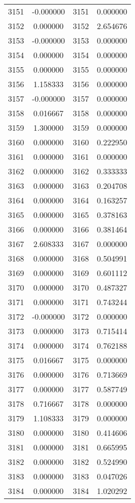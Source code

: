 \documentclass[12pt]{article}
\begin{document}
\begin{longtable}{@{}cccc@{}}
3151 & -0.000000 & 3151 & 0.000000 \\
3152 & 0.000000 & 3152 & 2.654676 \\
3153 & -0.000000 & 3153 & 0.000000 \\
3154 & 0.000000 & 3154 & 0.000000 \\
3155 & 0.000000 & 3155 & 0.000000 \\
3156 & 1.158333 & 3156 & 0.000000 \\
3157 & -0.000000 & 3157 & 0.000000 \\
3158 & 0.016667 & 3158 & 0.000000 \\
3159 & 1.300000 & 3159 & 0.000000 \\
3160 & 0.000000 & 3160 & 0.222950 \\
3161 & 0.000000 & 3161 & 0.000000 \\
3162 & 0.000000 & 3162 & 0.333333 \\
3163 & 0.000000 & 3163 & 0.204708 \\
3164 & 0.000000 & 3164 & 0.163257 \\
3165 & 0.000000 & 3165 & 0.378163 \\
3166 & 0.000000 & 3166 & 0.381464 \\
3167 & 2.608333 & 3167 & 0.000000 \\
3168 & 0.000000 & 3168 & 0.504991 \\
3169 & 0.000000 & 3169 & 0.601112 \\
3170 & 0.000000 & 3170 & 0.487327 \\
3171 & 0.000000 & 3171 & 0.743244 \\
3172 & -0.000000 & 3172 & 0.000000 \\
3173 & 0.000000 & 3173 & 0.715414 \\
3174 & 0.000000 & 3174 & 0.762188 \\
3175 & 0.016667 & 3175 & 0.000000 \\
3176 & 0.000000 & 3176 & 0.713669 \\
3177 & 0.000000 & 3177 & 0.587749 \\
3178 & 0.716667 & 3178 & 0.000000 \\
3179 & 1.108333 & 3179 & 0.000000 \\
3180 & 0.000000 & 3180 & 0.414606 \\
3181 & 0.000000 & 3181 & 0.665995 \\
3182 & 0.000000 & 3182 & 0.524990 \\
3183 & 0.000000 & 3183 & 0.047026 \\
3184 & 0.000000 & 3184 & 1.020292 \\

\end{longtable}
\end{document}
